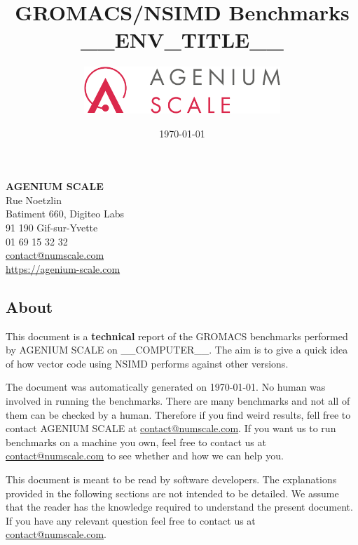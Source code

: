 \documentclass[a4paper,11pt]{article}
\date{\today}
\author{\includegraphics[width=20em]{logo_agenium_scale}}
\title{GROMACS/NSIMD Benchmarks __ENV_TITLE__}
\newcommand{\gromacs}{GROMACS}
\newcommand{\nsimd}{NSIMD}
\newcommand{\ageniumscale}{AGENIUM SCALE}
\begin{document}
\maketitle%
\vspace*{\fill}%
\noindent%
\textbf{\ageniumscale{}}\\
Rue Noetzlin\\
Batiment 660, Digiteo Labs\\
91 190 Gif-sur-Yvette\\
01 69 15 32 32\\
\href{mailto://contact@numscale.com}{contact@numscale.com}\\
\href{https://agenium-scale.com}{https://agenium-scale.com}\\
\thispagestyle{empty}
\clearpage
%
\thispagestyle{empty}
\tableofcontents
\newpage

\subsection*{About}%
\label{sec:about}

This document is a \textbf{technical} report of the \gromacs{} benchmarks
performed by \ageniumscale{} on __COMPUTER__. The aim
is to give a quick idea of how vector code using \nsimd{} performs against
other versions.

The document was automatically generated on \today. No human was involved in
running the benchmarks. There are many benchmarks and not all of them can be
checked by a human. Therefore if you find weird results, fell free to contact
\ageniumscale{} at \href{mailto://contact@numscale.com}{contact@numscale.com}.
If you want us to run benchmarks on a machine you own, feel free to contact us
at \href{mailto://contact@numscale.com}{contact@numscale.com} to see whether
and how we can help you.

This document is meant to be read by software developers. The explanations
provided in the following sections are not intended to be detailed. We assume
that the reader has the knowledge required to understand the present document.
If you have any relevant question feel free to contact us at
\href{mailto://contact@numscale.com}{contact@numscale.com}.
\end{document}
